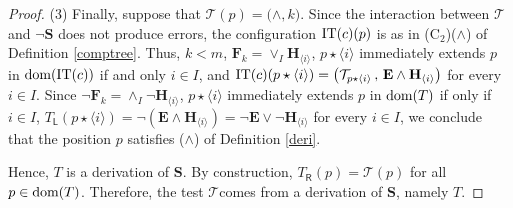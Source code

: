 \documentclass[copyright,creativecommons]{eptcs}
\newcommand{\vv}{\langle}
\newcommand{\ww}{\rangle}
\newcommand{\cT}{\mathcal{T}}
\newcommand{\Dis}[1]{\big( #1 \big)}
\newcommand{\bF}{\mathbf{F}}
\newcommand{\bH}{\mathbf{H}}
\newcommand{\bS}{\mathbf{S}}
\newcommand{\bE}{\mathbf{E}}
\newcommand{\dom}{\ensuremath{\textnormal{dom}}}
\newcommand{\CT}{\textnormal{IT}}
\newcommand{\sR}{\mathsf{R}}
\newcommand{\sL}{\mathsf{L}}
\theoremstyle{definition}
\begin{document}
\begin{proof}
(3) Finally, suppose that $\cT(p) = \Dis{\wedge, k}$.
Since the interaction between \/$\cT$\@ and  \/$\neg \bS$\@
 does not produce errors, the configuration
$\CT(c)(p)$ is as in  (C$_2$)($\wedge$)
 of Definition \ref{comptree}. Thus,
 $k < m$,
 $\bF_k = \vee_{I} \bH_{\vv i \ww}$,
$p \star \vv i \ww$ immediately extends $ p$ in $\dom(\CT(c))$ if and only $i \in I$,
 and   $\CT(c)(p \star \vv i \ww) = \big( \cT_{p \star \vv i \ww}   \, , \, \bE \wedge \bH_{\vv i \ww} \big)$
 for every $i \in I$.
  Since $\neg \bF_k = \wedge_{I} \neg \bH_{\vv i \ww}$,
$p \star \vv i \ww$ immediately extends $ p$ in $\dom(T)$ if only if $ i \in I$,
   $T_\sL(p \star \vv i \ww) = \neg(\bE \wedge \bH_{\vv i \ww}) = \neg \bE \vee \neg \bH_{\vv i \ww}$ for every $i \in I$, we conclude that
 the position
 $p$ satisfies   ($\wedge$) of Definition
\ref{deri}.



Hence, $T$ is a derivation of $\bS$.
By construction, $T_\sR(p) = \cT(p)$ for all
$p \in \dom(T)$. Therefore, the test \/$\cT$\@ comes from a derivation of \/$\bS$\@, namely \/$T$\@. \end{proof}









\nocite{*}


\end{document}
